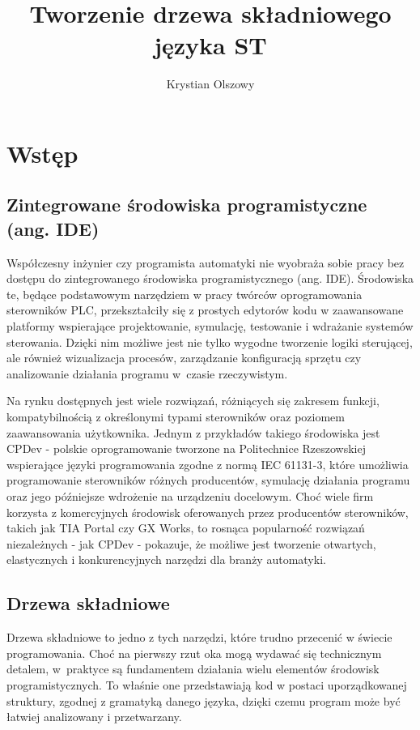 \documentclass[12pt,twoside]{article}
\author{Krystian Olszowy}
\title{Tworzenie drzewa składniowego języka ST}
\begin{document}
\maketitle

\blankpage

\tableofcontents

\clearpage
\blankpage

\section{Wstęp}
\subsection{Zintegrowane środowiska programistyczne (ang. IDE)}
Współczesny inżynier czy programista automatyki nie wyobraża sobie pracy bez dostępu do zintegrowanego środowiska programistycznego (ang. IDE). Środowiska te, będące podstawowym narzędziem w pracy twórców oprogramowania sterowników PLC, przekształciły się z prostych edytorów kodu w zaawansowane platformy wspierające projektowanie, symulację, testowanie i wdrażanie systemów sterowania. Dzięki nim możliwe jest nie tylko wygodne tworzenie logiki sterującej, ale również wizualizacja procesów, zarządzanie konfiguracją sprzętu czy analizowanie działania programu w~czasie rzeczywistym.

Na rynku dostępnych jest wiele rozwiązań, różniących się zakresem funkcji, kompatybilnością z określonymi typami sterowników oraz poziomem zaawansowania użytkownika. Jednym z przykładów takiego środowiska jest CPDev - polskie oprogramowanie tworzone na Politechnice Rzeszowskiej wspierające języki programowania zgodne z normą IEC 61131-3, które umożliwia programowanie sterowników różnych producentów, symulację działania programu oraz jego późniejsze wdrożenie na urządzeniu docelowym. Choć wiele firm korzysta z komercyjnych środowisk oferowanych przez producentów sterowników, takich jak TIA Portal czy GX Works, to rosnąca popularność rozwiązań niezależnych - jak CPDev - pokazuje, że możliwe jest tworzenie otwartych, elastycznych i konkurencyjnych narzędzi dla branży automatyki.

\subsection{Drzewa składniowe}
Drzewa składniowe to jedno z tych narzędzi, które trudno przecenić w świecie programowania. Choć na pierwszy rzut oka mogą wydawać się technicznym detalem, w~praktyce są fundamentem działania wielu elementów środowisk programistycznych. To właśnie one przedstawiają kod w postaci uporządkowanej struktury, zgodnej z gramatyką danego języka, dzięki czemu program może być łatwiej analizowany i przetwarzany.
\end{document}
